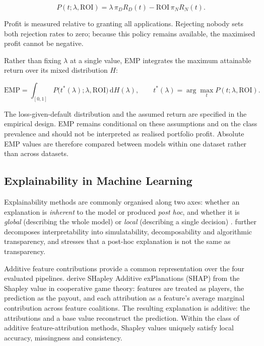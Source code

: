 \begin{equation}
P(t;\lambda,\mathrm{ROI})
= \lambda\,\pi_D R_D(t)
- \mathrm{ROI}\,\pi_N R_N(t).
\label{eq:profit}
\end{equation}

Profit is measured relative to granting all applications. Rejecting nobody
sets both rejection rates to zero; because this policy remains available,
the maximised profit cannot be negative.

Rather than fixing $\lambda$ at a single value, EMP integrates the maximum
attainable return over its mixed distribution $H$:

\begin{equation}
\mathrm{EMP}
= \int_{[0,1]}
P\bigl(t^*(\lambda);\lambda,\mathrm{ROI}\bigr)\,
\mathrm{d}H(\lambda),
\qquad
t^*(\lambda)
= \arg\max_t P(t;\lambda,\mathrm{ROI}).
\label{eq:emp}
\end{equation}

The loss-given-default distribution and the assumed return are specified in the
empirical design. EMP remains conditional on these assumptions and on the class
prevalence and should not be interpreted as realised portfolio profit. Absolute EMP
values are therefore compared between models within one dataset rather than across
datasets.

\subsection{Explainability in Machine Learning}\label{sec:xai}

Explainability methods are commonly organised along two axes: whether an
explanation is \emph{inherent} to the model or produced \emph{post hoc}, and
whether it is \emph{global} (describing the whole model) or \emph{local}
(describing a single decision) \citep{nautaAnecdotalEvidenceQuantitative2023}. \citet{liptonMythosModelInterpretability2018} further
decomposes interpretability into simulatability, decomposability and algorithmic
transparency, and stresses that a post-hoc explanation is not the same as
transparency. 

Additive feature contributions provide a common representation over the four
evaluated pipelines. \citet{lundbergUnifiedApproachInterpreting2017} derive SHapley Additive exPlanations (SHAP) from the Shapley value in cooperative game theory:
features are treated as players, the prediction as the payout, and each attribution
as a feature's average marginal contribution across feature coalitions. The resulting
explanation is additive: the attributions and a base value reconstruct the prediction.
Within the class of additive feature-attribution methods, Shapley values uniquely
satisfy local accuracy, missingness and consistency.

